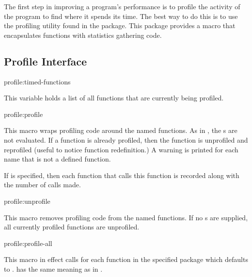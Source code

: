 The first step in improving a program's performance is to profile the
activity of the program to find where it spends its time.  The best
way to do this is to use the profiling utility found in the
 package.  This package provides a macro 
that encapsulates functions with statistics gathering code.


\subsection{Profile Interface}

\begin{defvar}{profile:}{timed-functions}
  
  This variable holds a list of all functions that are currently being
  profiled.
\end{defvar}

\begin{defmac}{profile:}{profile}{%
    }
  
  This macro wraps profiling code around the named functions.  As in
  , the s are not evaluated.  If a function is
  already profiled, then the function is unprofiled and reprofiled
  (useful to notice function redefinition.)  A warning is printed for
  each name that is not a defined function.
  
  If  is specified, then each function that calls
  this function is recorded along with the number of calls made.
\end{defmac}

\begin{defmac}{profile:}{unprofile}{%
    }
  
  This macro removes profiling code from the named functions.  If no
  s are supplied, all currently profiled functions are
  unprofiled.
\end{defmac}

\begin{defmac}{profile:}{profile-all}{%
    }
  
  This macro in effect calls  for each
  function in the specified package which defaults to
  .   has the same meaning as in
  .
\end{defmac}

